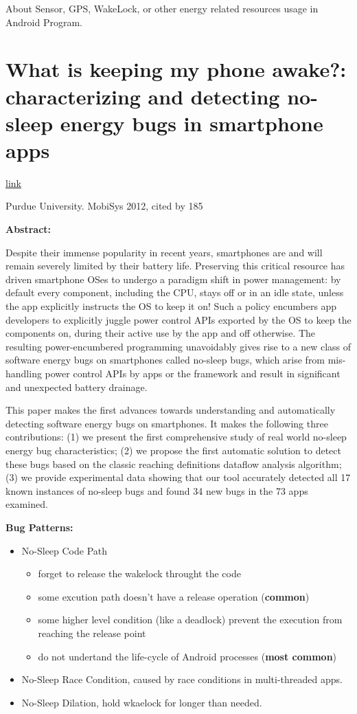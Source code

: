 \documentclass{article}
\begin{document}
About Sensor, GPS, WakeLock, or other energy related resources usage in Android Program.

\section{What is keeping my phone awake?: characterizing and detecting no-sleep
  energy bugs in smartphone apps}

\href{http://dl.acm.org/citation.cfm?id=2307661}{link}

Purdue University. MobiSys 2012, cited by 185


\textbf{Abstract:}

Despite their immense popularity in recent years, smartphones are and will
remain severely limited by their battery life. Preserving this critical resource
has driven smartphone OSes to undergo a paradigm shift in power management: by
default every component, including the CPU, stays off or in an idle state,
unless the app explicitly instructs the OS to keep it on! Such a policy
encumbers app developers to explicitly juggle power control APIs exported by the
OS to keep the components on, during their active use by the app and off
otherwise. The resulting power-encumbered programming unavoidably gives rise to
a new class of software energy bugs on smartphones called no-sleep bugs, which
arise from mis-handling power control APIs by apps or the framework and result
in significant and unexpected battery drainage.

This paper makes the first advances towards understanding and automatically
detecting software energy bugs on smartphones. It makes the following three
contributions: (1) we present the first comprehensive study of real world
no-sleep energy bug characteristics; (2) we propose the first automatic solution
to detect these bugs based on the classic reaching definitions dataflow analysis
algorithm; (3) we provide experimental data showing that our tool accurately
detected all 17 known instances of no-sleep bugs and found 34 new bugs in the 73
apps examined.

\textbf{Bug Patterns:}
\begin{itemize}
\item No-Sleep Code Path
  \begin{itemize}
  \item forget to release the wakelock throught the code
  \item some excution path doesn't have a release operation (\textbf{common})
  \item some higher level condition (like a deadlock) prevent the execution from
    reaching the release point
  \item do not undertand the life-cycle of Android processes (\textbf{most
      common})
  \end{itemize}
\item No-Sleep Race Condition, caused by race conditions in multi-threaded apps.
\item No-Sleep Dilation, hold wkaelock for longer than needed.
\end{itemize}
\end{document}

